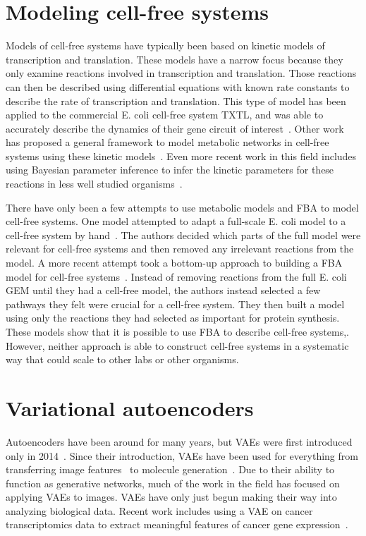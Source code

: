 \section{Modeling cell-free systems}\label{rw:mod-cf}
Models of cell-free systems have typically been based on kinetic models of transcription and translation.
These models have a narrow focus because they only examine reactions involved in transcription and translation.
Those reactions can then be described using differential equations with known rate constants to describe the rate of transcription and translation.
This type of model has been applied to the commercial E. coli cell-free system TXTL, and was able to accurately describe the dynamics of their gene circuit of interest~\cite{tuza2013silico}.
Other work has proposed a general framework to model metabolic networks in cell-free systems using these kinetic models~\cite{wayman2015dynamic}.
Even more recent work in this field includes using Bayesian parameter inference to infer the kinetic parameters for these reactions in less well studied organisms~\cite{moore2018rapid}.

There have only been a few attempts to use metabolic models and FBA to model cell-free systems.
One model attempted to adapt a full-scale E. coli model to a cell-free system by hand~\cite{bujara2012silico}.
The authors decided which parts of the full model were relevant for cell-free systems and then removed any irrelevant reactions from the model.
A more recent attempt took a bottom-up approach to building a FBA model for cell-free systems~\cite{vilkhovoy2017sequence}.
Instead of removing reactions from the full E. coli GEM until they had a cell-free model, the authors instead selected a few pathways they felt were crucial for a cell-free system.
They then built a model using only the reactions they had selected as important for protein synthesis.
These models show that it is possible to use FBA to describe cell-free systems,.
However, neither approach is able to construct cell-free systems in a systematic way that could scale to other labs or other organisms.


\section{Variational autoencoders}
Autoencoders have been around for many years, but VAEs were first introduced only in 2014~\cite{kingma2013auto, rezende2014stochastic}.
Since their introduction, VAEs have been used for everything from transferring image features~\cite{larsen2015autoencoding} to molecule generation~\cite{gomez2016automatic}.
Due to their ability to function as generative networks, much of the work in the field has focused on applying VAEs to images.
VAEs have only just begun making their way into analyzing biological data.
Recent work includes using a VAE on cancer transcriptomics data to extract meaningful features of cancer gene expression~\cite{way2017extracting}.

